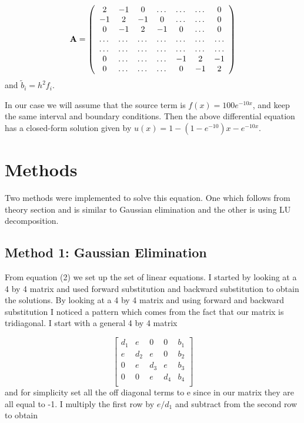 \documentclass[11pt,a4wide]{article}
\begin{document}
\begin{equation}
    {\bf A} = \left(\begin{array}{ccccccc}
                           2& -1& 0& \dots& \dots&  \dots &0 \\
                           -1 & 2 & -1 &0 &\dots &\dots &0 \\
                           0&-1 &2 & -1 & 0 & \dots &0\\
                           \dots& \dots   & \dots &\dots   &\dots & \dots &\dots\\
                           
						  \dots &\dots &\dots &\dots &\dots &\dots &\dots \\
                           0 &\dots   &\dots  &\dots &-1 &2& -1 \\
                           0 &\dots    &\dots  &\dots & 0  &-1 & 2 \\
                      \end{array} \right)
\end{equation}
and $\tilde{b}_i=h^2f_i$.


In our case we will assume  that the source term is 
$f(x) = 100e^{-10x}$, and keep the same interval and boundary 
conditions. Then the above differential equation
has a closed-form  solution given by $u(x) = 1-(1-e^{-10})x-e^{-10x}$. 

\section{Methods}
Two methods were implemented to solve this equation. One which follows from theory 
section and is similar to Gaussian elimination and the other is using LU decomposition.

\subsection{Method 1: Gaussian Elimination}
From equation (2) we set up the set of linear equations. I started by looking at a 4 by 
4 matrix and used forward substitution and backward substitution to obtain the solutions. By looking at a 4 by 4 matrix and using forward and backward substitution I noticed a pattern which comes from the fact that our matrix is tridiagonal. I start with a general 4 by 4 matrix 

\begin{equation}
\left[\begin{array}{cccc|c}
                           d_1& e& 0& 0& b_1\\ 
                           e& d_2& e& 0& b_2\\
                           0& e& d_3& e& b_3\\
                           0& 0& e& d_4& b_4\\
                      \end{array} \right]
\end{equation}
and for simplicity set all the off diagonal terms to e since in our matrix they are all equal to -1. I 
multiply the first row by $e/d_1$ and subtract from the second row to obtain 
\end{document}
